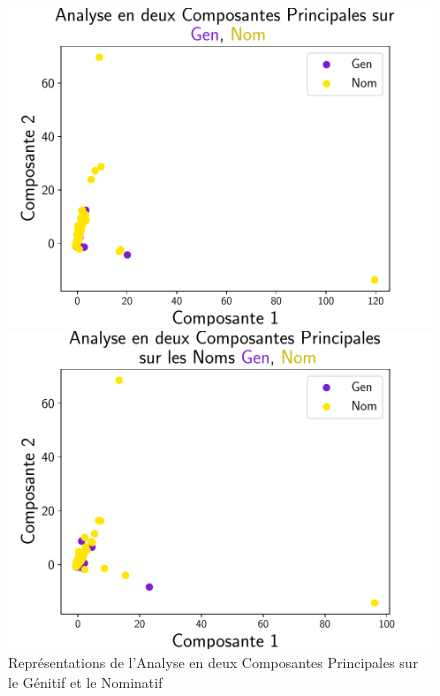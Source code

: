 \documentclass{cours}
\begin{document}
\begin{figure}[H]
	\begin{minipage}{.5\textwidth}
	\begin{center}
	\includegraphics[width=\linewidth]{Figures/Visualisations/pca_Gen_Nom}
	\end{center}
	\end{minipage}
	\begin{minipage}{.5\textwidth}
	\begin{center}
	\includegraphics[width=\linewidth]{Figures/Visualisations/pca_Gen_Nom_Nouns}
	\end{center}
	\end{minipage}
	\caption{Représentations de l'Analyse en deux Composantes Principales sur le Génitif et le Nominatif}
\end{figure}
\end{document}
